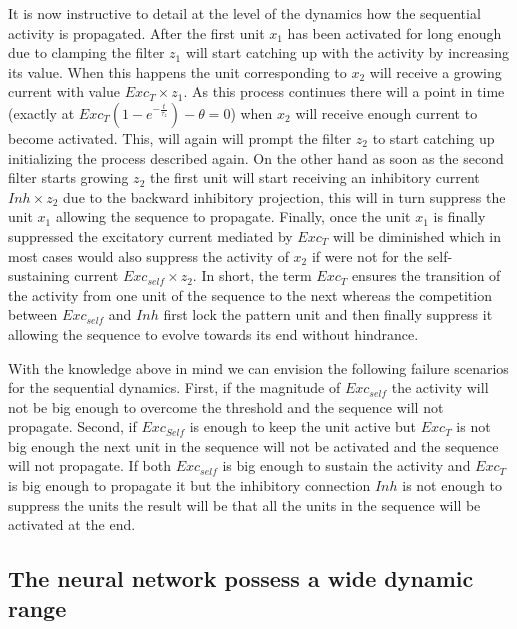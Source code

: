 \documentclass{esannV2}
\begin{document}
It is now instructive to detail at the level of the dynamics how the sequential activity is propagated. After the first unit $x_1$ has been activated for long enough due to clamping the filter $z_1$ will start catching up with the activity by increasing its value. When this happens the unit corresponding to $x_2$ will receive a growing current with value $Exc_{T} \times z_1$. As this process continues there will a point in time (exactly at $Exc_{T}(1 - e^{-\frac{t}{\tau_z}}) - \theta = 0$) when $x_2$ will receive enough current to become activated. This, will again will prompt the filter $z_2$ to start catching up initializing the process described again. On the other hand as soon as the second filter starts growing $z_2$ the first unit will start receiving an inhibitory current $Inh \times z_2$ due to the backward inhibitory projection, this will in turn suppress the unit $x_1$ allowing the sequence to propagate. Finally, once the unit $x_1$ is finally suppressed the excitatory current mediated by $Exc_T$ will be diminished which in most cases would also suppress the activity of $x_2$ if were not for the self-sustaining current $Exc_{self} \times z_2$. In short, the term $Exc_T$ ensures the transition of the activity from one unit of the sequence to the next whereas the competition between $Exc_{self}$ and $Inh$ first lock the pattern unit and then finally suppress it allowing the sequence to evolve towards its end without hindrance.

With the knowledge above in mind we can envision the following  failure scenarios for the sequential dynamics. First, if the magnitude of $Exc_{self}$ the activity will not be big enough to overcome the threshold and the sequence will not propagate. Second, if $Exc_{Self}$ is enough to keep the unit active but $Exc_{T}$ is not big enough the next unit in the sequence will not be activated and the sequence will not propagate. If both $Exc_{self}$ is big enough to sustain the activity and $Exc_{T}$ is big enough to propagate it but the inhibitory connection $Inh$ is not enough to suppress the units the result will be that all the units in the sequence will be activated at the end. 


\subsection{The neural network possess a wide dynamic range}
\end{document}
